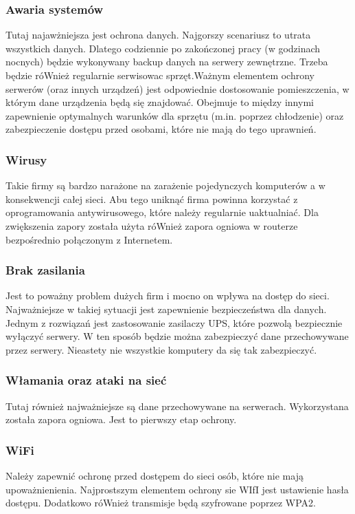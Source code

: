 \documentclass{article}
\begin{document}
\subsubsection{Awaria systemów}
Tutaj najawżniejsza jest ochrona danych.  Najgorszy scenariusz to utrata wszystkich danych. Dlatego codziennie po zakończonej pracy (w godzinach nocnych) będzie wykonywany backup danych na serwery zewnętrzne. Trzeba będzie róWnież regularnie serwisowac sprzęt.Ważnym elementem ochrony serwerów (oraz innych urządzeń) jest odpowiednie dostosowanie pomieszczenia, w którym dane urządzenia będą się znajdować. Obejmuje to między innymi zapewnienie optymalnych warunków dla sprzętu (m.in. poprzez chłodzenie) oraz zabezpieczenie dostępu przed osobami, które nie mają do tego uprawnień.

\subsubsection{Wirusy}
Takie firmy są bardzo narażone na zarażenie pojedynczych komputerów a w konsekwencji całej sieci. Abu tego uniknąć firma powinna korzystać z oprogramowania antywirusowego, które należy regularnie uaktualniać. Dla zwiększenia zapory została użyta róWnież zapora ogniowa w routerze bezpośrednio połączonym z Internetem.

\subsubsection{Brak zasilania}
Jest to poważny problem dużych firm i mocno on wpływa na dostęp do sieci. Najważniejsze w takiej sytuacji jest zapewnienie bezpieczeństwa dla danych. 
Jednym z rozwiązań jest zastosowanie zasilaczy UPS, które pozwolą bezpiecznie wyłączyć serwery.  W ten sposób będzie można zabezpieczyć dane przechowywane przez serwery. Nieastety nie wszystkie komputery da się tak zabezpieczyć.

\subsubsection{Włamania oraz ataki na sieć}
Tutaj również najważniejsze są dane przechowywane na serwerach.
Wykorzystana została zapora ogniowa. Jest to pierwszy etap ochrony.

\subsubsection{WiFi}
Należy zapewnić ochronę przed dostępem do sieci osób, które nie mają upoważnienienia.
Najprostszym elementem ochrony sie WIfI jest ustawienie hasła dostępu. Dodatkowo róWnież transmisje będą szyfrowane poprzez WPA2.
\end{document}
